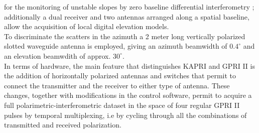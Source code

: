 for the monitoring of unstable slopes by zero baseline differential interferometry \cite{Massonnet1993,JGRB:JGRB7093}; additionally a dual receiver and two antennas arranged along a spatial baseline, allow the acquisition of local digital elevation models.\\
To discriminate the scatters in the azimuth a 2 meter long vertically polarized slotted waveguide antenna is employed, giving an azimuth beamwidth of $0.4^\circ$ and an elevation beamwdith of approx. $30^\circ$.\\
In terms of hardware, the main feature that distinguishes KAPRI and GPRI II is the addition of horizontally polarized antennas and switches that permit to connect the transmitter and the receiver to either type of antenna. These changes, together with modifications in the control software, permit to acquire a full polarimetric-interferometric dataset in the space of four regular GPRI II pulses by temporal multiplexing, i.e by cycling through all the combinations of transmitted and received polarization.
